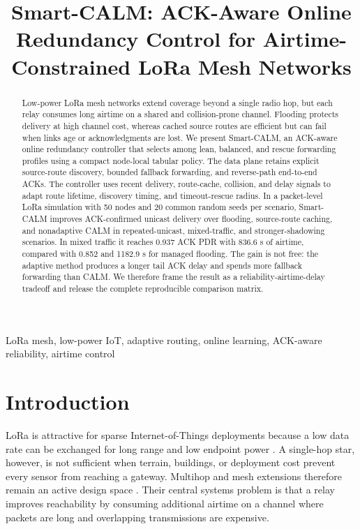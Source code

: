 \documentclass[10pt,conference,letterpaper]{IEEEtran}
\title{Smart-CALM: ACK-Aware Online Redundancy Control for Airtime-Constrained LoRa Mesh Networks}
\author{
\IEEEauthorblockN{Author Name}
\IEEEauthorblockA{Department or Laboratory, Institution\\
City, Country\\
Email: your.email@example.com}
}
\begin{document}
\maketitle

\begin{abstract}
Low-power LoRa mesh networks extend coverage beyond a single radio hop, but
each relay consumes long airtime on a shared and collision-prone channel.
Flooding protects delivery at high channel cost, whereas cached source routes
are efficient but can fail when links age or acknowledgments are lost. We
present Smart-CALM, an ACK-aware online redundancy controller that selects
among lean, balanced, and rescue forwarding profiles using a compact
node-local tabular policy. The data plane retains explicit source-route
discovery, bounded fallback forwarding, and reverse-path end-to-end ACKs. The
controller uses recent delivery, route-cache, collision, and delay signals to
adapt route lifetime, discovery timing, and timeout-rescue radius. In a
packet-level LoRa simulation with 50 nodes and 20 common random seeds per
scenario, Smart-CALM improves ACK-confirmed unicast delivery over flooding,
source-route caching, and nonadaptive CALM in repeated-unicast, mixed-traffic,
and stronger-shadowing scenarios. In mixed traffic it reaches 0.937 ACK PDR
with 836.6 s of airtime, compared with 0.852 and 1182.9 s for managed
flooding. The gain is not free: the adaptive method produces a longer tail ACK
delay and spends more fallback forwarding than CALM. We therefore frame the
result as a reliability-airtime-delay tradeoff and release the complete
reproducible comparison matrix.
\end{abstract}

\begin{IEEEkeywords}
LoRa mesh, low-power IoT, adaptive routing, online learning, ACK-aware
reliability, airtime control
\end{IEEEkeywords}

\section{Introduction}

LoRa is attractive for sparse Internet-of-Things deployments because a low
data rate can be exchanged for long range and low endpoint power
\cite{augustin2016study}. A single-hop star, however, is not sufficient when
terrain, buildings, or deployment cost prevent every sensor from reaching a
gateway. Multihop and mesh extensions therefore remain an active design space
\cite{cotrim2020lorawanmesh,centelles2021beyond,wong2024multihop}. Their
central systems problem is that a relay improves reachability by consuming
additional airtime on a channel where packets are long and overlapping
transmissions are expensive.
\end{document}
